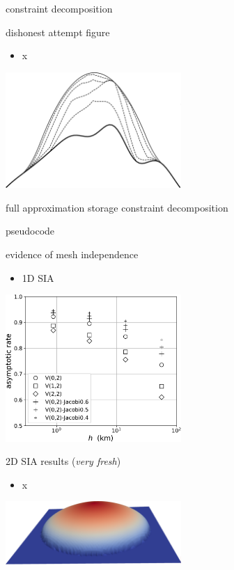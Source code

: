 \documentclass[svgnames,
               hyperref={colorlinks,citecolor=DeepPink4,linkcolor=FireBrick,urlcolor=Maroon},
               usepdftitle=false]  %
               {beamer}
\begin{document}
\begin{frame}{constraint decomposition}

dishonest attempt figure

\begin{itemize}
\item x
\end{itemize}

\includegraphics[width=0.5\textwidth]{images/icedecomp.png}
\end{frame}


\begin{frame}{full approximation storage constraint decomposition}

pseudocode
\end{frame}


\begin{frame}{evidence of mesh independence}

\begin{itemize}
\item 1D SIA
\end{itemize}

\includegraphics[width=0.5\textwidth]{images/sia-asymprates.pdf}
\end{frame}


\begin{frame}{2D SIA results (\emph{very fresh})}

\begin{itemize}
\item x
\end{itemize}

\includegraphics[width=0.5\textwidth]{images/fascd-firedrake-dome.png}
\end{frame}
\end{document}
